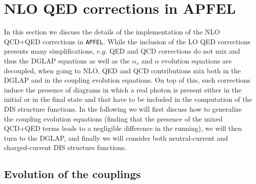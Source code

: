 \appendix

\section{NLO QED corrections in APFEL} \label{sec:appendixAPFEL}

In this section we discuss the details of the implementation of the
NLO QCD+QED corrections in {\tt APFEL}. While the inclusion of the LO
QED corrections presents many simplifications, $e.g.$ QED and QCD
corrections do not mix and thus the DGLAP equations as well as the
$\alpha_s$ and $\alpha$ evolution equations are decoupled, when going
to NLO, QED and QCD contributions mix both in the DGLAP and in the
coupling evolution equations. On top of this, such corrections induce
the presence of diagrams in which a real photon is present either in
the initial or in the final state and that have to be included in the
computation of the DIS structure functions. In the following we will
first discuss how to generalize the coupling evolution equations
(finding that the presence of the mixed QCD+QED terms leads to a
negligible difference in the running), we will then turn to the DGLAP,
and finally we will consider both neutral-current and charged-current
DIS structure functions.

\subsection{Evolution of the couplings}

